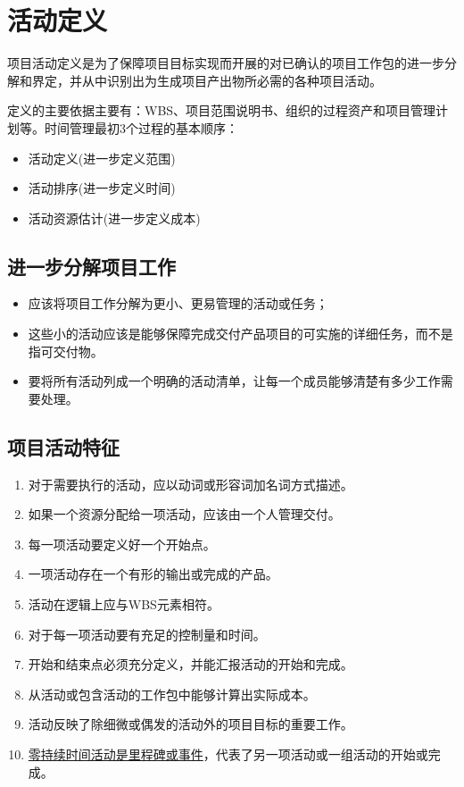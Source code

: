 \section{活动定义}
项目活动定义是为了保障项目目标实现而开展的对已确认的项目工作包的进一步分解和界定，并从中识别出为生成项目产出物所必需的各种项目活动。 
\par 定义的主要依据主要有：WBS、项目范围说明书、组织的过程资产和项目管理计划等。时间管理最初3个过程的基本顺序：
\begin{itemize}
	\item 活动定义(进一步定义范围)
	\item 活动排序(进一步定义时间) 
	\item 活动资源估计(进一步定义成本)
\end{itemize}
\subsection{进一步分解项目工作}
\begin{itemize}
	\item 应该将项目工作分解为更小、更易管理的活动或任务；
	\item 这些小的活动应该是能够保障完成交付产品项目的可实施的详细任务，而不是指可交付物。
	\item 要将所有活动列成一个明确的活动清单，让每一个成员能够清楚有多少工作需要处理。
\end{itemize}
\subsection{项目活动特征}
\begin{enumerate}
	\item 对于需要执行的活动，应以动词或形容词加名词方式描述。
	\item 如果一个资源分配给一项活动，应该由一个人管理交付。
	\item 每一项活动要定义好一个开始点。
	\item 一项活动存在一个有形的输出或完成的产品。
	\item 活动在逻辑上应与WBS元素相符。
	\item 对于每一项活动要有充足的控制量和时间。
	\item 开始和结束点必须充分定义，并能汇报活动的开始和完成。
	\item 从活动或包含活动的工作包中能够计算出实际成本。
	\item 活动反映了除细微或偶发的活动外的项目目标的重要工作。
	\item \underline{零持续时间活动是里程碑或事件}，代表了另一项活动或一组活动的开始或完成。
\end{enumerate}
